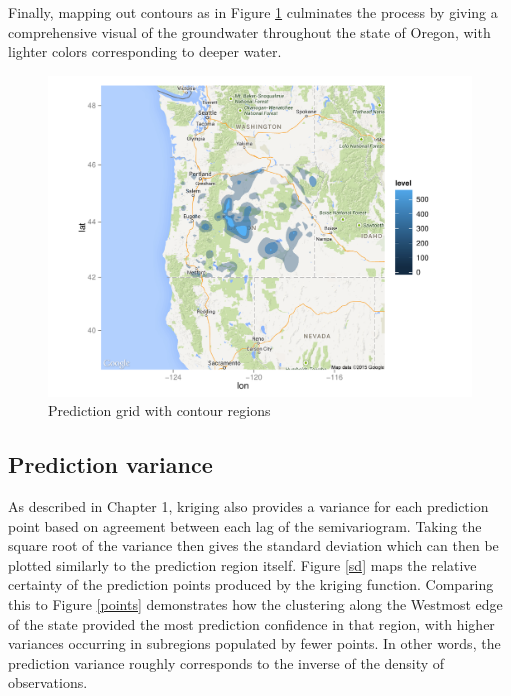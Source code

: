 \documentclass[12pt,twoside]{reedthesis}
\begin{document}
Finally, mapping out contours as in Figure \ref{polygon} culminates the process by giving a comprehensive visual of the groundwater throughout the state of Oregon, with lighter colors corresponding to deeper water.
	
\begin{figure}[h]
	   
	       \centering
	  
	    \includegraphics[scale=0.5]{polygon_plot}
	
	     \caption{Prediction grid with contour regions}
	 \label{polygon}
	\end{figure}
	
	   
	  
	
	
\subsection{Prediction variance}

As described in Chapter 1, kriging also provides a variance for each prediction point based on agreement between each lag of the semivariogram. Taking the square root of the variance then gives the standard deviation which can then be plotted similarly to the prediction region itself. Figure \ref{sd} maps the relative certainty of the prediction points produced by the kriging function. Comparing this to Figure \ref{points} demonstrates how the clustering along the Westmost edge of the state provided the most prediction confidence in that region, with higher variances occurring in subregions populated by fewer points. In other words, the prediction variance roughly corresponds to the inverse of the density of observations. 
	
\end{document}
